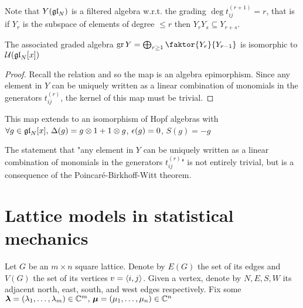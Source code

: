 \documentclass{article}
\begin{document}
Note that $Y(\mathfrak{gl}_N)$ is a filtered algebra w.r.t. the grading $\deg t_{ij}^{(r+1)} = r$, that is if $Y_r$ is the subspace of elements of degree $\leq r$ then $Y_r Y_s \subseteq Y_{r+s}$. 

\begin{prop}
The associated graded algebra $\gr Y = \bigoplus_{r \geq 1} \faktor{Y_r}{Y_{r-1}}$ is isomorphic to $\mathcal{U}(\mathfrak{gl}_N[x])$
\end{prop}
\begin{proof}
Recall the relation 
and so the map 
is an algebra epimorphism. Since any element in $Y$ can be uniquely written as a linear combination of monomials in the generators $t_{ij}^{(r)}$, the kernel of this map must be trivial. 
\end{proof}

\begin{remark}
This map extends to an isomorphism of Hopf algebras with $\forall g \in \mathfrak{gl}_N[x], \, \Delta(g) = g \otimes 1 + 1 \otimes g$, $\epsilon(g) = 0$, $S(g) = -g$
\end{remark}

\begin{remark}
The statement that "any element in $Y$ can be uniquely written as a linear combination of monomials in the generators $t_{ij}^{(r)}$" is not entirely trivial, but is a consequence of the Poincar\'e-Birkhoff-Witt theorem. 
\end{remark}

\section{Lattice models in statistical mechanics}

Let $G$ be an $m \times n$ square lattice. Denote by $E(G)$ the set of its edges and $V(G)$ the set of its vertices $v = \left\langle i,j \right\rangle$. Given a vertex, denote by $N,E,S,W$ its adjacent north, east, south, and west edges respectively. Fix some $\bm{\lambda} = (\lambda_1, \dots, \lambda_m)\in \mathbb{C}^m, \, \bm{\mu} = (\mu_1, \dots, \mu_n)\in \mathbb{C}^n$
\end{document}
